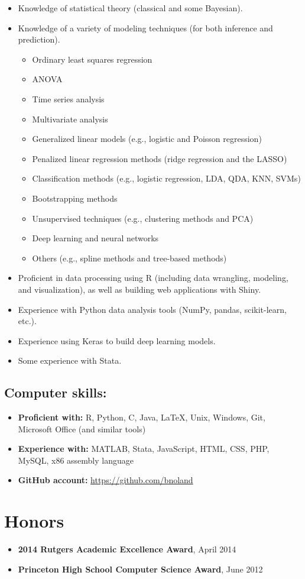 \documentclass[letterpaper,12pt]{article}
\begin{document}
\begin{itemize}
\item Knowledge of statistical theory (classical and some Bayesian).
\item Knowledge of a variety of modeling techniques (for both
  inference and prediction).
\begin{itemize}
\item Ordinary least squares regression
\item ANOVA
\item Time series analysis
\item Multivariate analysis
\item Generalized linear models (e.g., logistic and Poisson
  regression)
\item Penalized linear regression methods (ridge regression and the
  LASSO)
\item Classification methods (e.g., logistic regression, LDA, QDA,
  KNN, SVMs)
\item Bootstrapping methods
\item Unsupervised techniques (e.g., clustering methods and PCA)
\item Deep learning and neural networks
\item Others (e.g., spline methods and tree-based methods)
\end{itemize}
\item Proficient in data processing using R (including data wrangling,
  modeling, and visualization), as well as building web applications
  with Shiny.
\item Experience with Python data analysis tools (NumPy, pandas,
  scikit-learn, etc.).
\item Experience using Keras to build deep learning models.
\item Some experience with Stata.
\end{itemize}

\subsection*{Computer skills:}

\begin{itemize}
\item \textbf{Proficient with:} R, Python, C, Java, \LaTeX, Unix,
  Windows, Git, Microsoft Office (and similar tools)
\item \textbf{Experience with:} MATLAB, Stata, JavaScript, HTML, CSS,
  PHP, MySQL, x86 assembly language
\item \textbf{GitHub account:} \url{https://github.com/bnoland}
\end{itemize}

\section*{Honors}
\begin{itemize}
\item \textbf{2014 Rutgers Academic Excellence Award}, April 2014
\item \textbf{Princeton High School Computer Science Award}, June 2012
\end{itemize}
\end{document}
